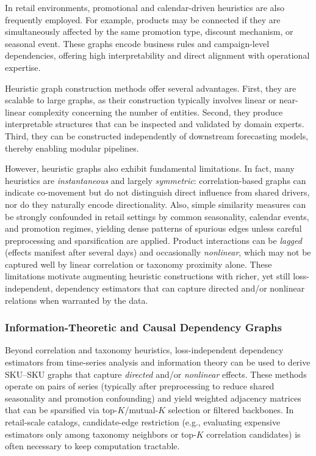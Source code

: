 In retail environments, promotional and calendar-driven heuristics are also frequently employed. For example,
products may be connected if they are simultaneously affected by the same promotion type, discount mechanism, or seasonal event. These graphs encode business rules and campaign-level dependencies, offering high interpretability and direct alignment with operational expertise.

Heuristic graph construction methods offer several advantages. First, they are scalable to large graphs, as their construction typically involves linear or near-linear complexity concerning the number of entities. Second, they produce interpretable structures that can be inspected and validated by domain experts. Third, they can be constructed independently of downstream forecasting models, thereby enabling modular pipelines.

However, heuristic graphs also exhibit fundamental limitations. In fact, many heuristics are
\emph{instantaneous} and largely \emph{symmetric}: correlation-based graphs can indicate co-movement but do not distinguish direct influence from shared drivers, nor do they naturally encode directionality.
Also, simple similarity measures can be strongly confounded in retail settings by common
seasonality, calendar events, and promotion regimes, yielding dense patterns of spurious edges
unless careful preprocessing and sparsification are applied. 
Product interactions can be \emph{lagged} (effects manifest after several days) and occasionally \emph{nonlinear}, which may not be captured well by linear correlation or taxonomy proximity alone. These limitations motivate augmenting heuristic constructions with richer, yet still loss-independent, dependency estimators that can capture directed and/or nonlinear relations when warranted by the data.

\subsubsection{Information-Theoretic and Causal Dependency Graphs}
Beyond correlation and taxonomy heuristics, loss-independent dependency estimators from time-series analysis and information theory can be used to derive SKU--SKU graphs that capture \emph{directed} and/or \emph{nonlinear} effects.
These methods operate on pairs of series (typically after preprocessing to reduce shared seasonality and promotion confounding) and yield weighted adjacency matrices that can be sparsified via top-$K$/mutual-$K$ selection or filtered backbones. In retail-scale catalogs, candidate-edge restriction (e.g., evaluating expensive estimators only among taxonomy neighbors or top-$K$ correlation candidates) is often necessary to keep computation tractable.

